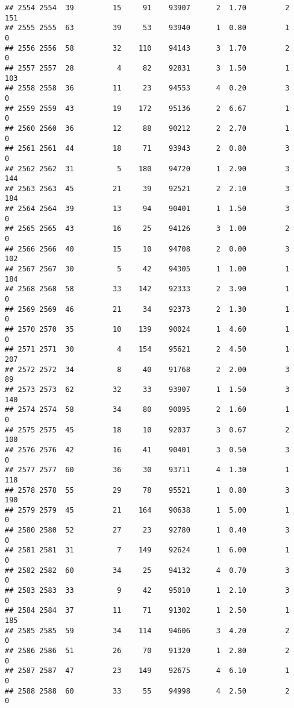 \documentclass[
]{article}
\begin{document}
\begin{verbatim}
## 2554 2554  39         15     91    93907      2  1.70         2      151
## 2555 2555  63         39     53    93940      1  0.80         1        0
## 2556 2556  58         32    110    94143      3  1.70         2        0
## 2557 2557  28          4     82    92831      3  1.50         1      103
## 2558 2558  36         11     23    94553      4  0.20         3        0
## 2559 2559  43         19    172    95136      2  6.67         1        0
## 2560 2560  36         12     88    90212      2  2.70         1        0
## 2561 2561  44         18     71    93943      2  0.80         3        0
## 2562 2562  31          5    180    94720      1  2.90         3      144
## 2563 2563  45         21     39    92521      2  2.10         3      184
## 2564 2564  39         13     94    90401      1  1.50         3        0
## 2565 2565  43         16     25    94126      3  1.00         2        0
## 2566 2566  40         15     10    94708      2  0.00         3      102
## 2567 2567  30          5     42    94305      1  1.00         1      184
## 2568 2568  58         33    142    92333      2  3.90         1        0
## 2569 2569  46         21     34    92373      2  1.30         1        0
## 2570 2570  35         10    139    90024      1  4.60         1        0
## 2571 2571  30          4    154    95621      2  4.50         1      207
## 2572 2572  34          8     40    91768      2  2.00         3       89
## 2573 2573  62         32     33    93907      1  1.50         3      140
## 2574 2574  58         34     80    90095      2  1.60         1        0
## 2575 2575  45         18     10    92037      3  0.67         2      100
## 2576 2576  42         16     41    90401      3  0.50         3        0
## 2577 2577  60         36     30    93711      4  1.30         1      118
## 2578 2578  55         29     78    95521      1  0.80         3      190
## 2579 2579  45         21    164    90638      1  5.00         1        0
## 2580 2580  52         27     23    92780      1  0.40         3        0
## 2581 2581  31          7    149    92624      1  6.00         1        0
## 2582 2582  60         34     25    94132      4  0.70         3        0
## 2583 2583  33          9     42    95010      1  2.10         3        0
## 2584 2584  37         11     71    91302      1  2.50         1      185
## 2585 2585  59         34    114    94606      3  4.20         2        0
## 2586 2586  51         26     70    91320      1  2.80         2        0
## 2587 2587  47         23    149    92675      4  6.10         1        0
## 2588 2588  60         33     55    94998      4  2.50         2        0

\end{verbatim}
\end{document}
